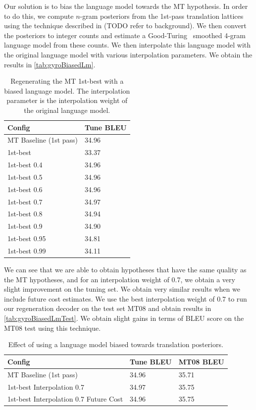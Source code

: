 Our solution is to bias the language model towards the MT hypothesis.
In order to do this, we compute $n$-gram posteriors from the
1st-pass translation lattices using the technique described
in (TODO refer to background). We then convert the posteriors
to integer counts and estimate a
Good-Turing~\citep{good:1953:biometrika,chen-goodman:1998:harvard} smoothed 4-gram
language model from these counts.
We then interpolate this language model with the original language model with
various interpolation parameters.
We obtain the results in \autoref{tab:gyroBiasedLm}.
%
\begin{table}
  \begin{center}
    \begin{tabular}{l|l}
      Config      & Tune BLEU \\
      \hline
      MT Baseline (1st pass) & 34.96 \\
      \hline
      1st-best      & 33.37 \\
      \hline
      1st-best 0.4  & 34.96 \\
      1st-best 0.5  & 34.96 \\
      1st-best 0.6  & 34.96 \\
      1st-best 0.7  & 34.97 \\
      1st-best 0.8  & 34.94 \\
      1st-best 0.9  & 34.90 \\
      1st-best 0.95 & 34.81 \\
      1st-best 0.99 & 34.11 \\
    \end{tabular}
    \caption{Regenerating the MT 1st-best with a biased language model.
      The interpolation parameter is the interpolation weight of the
      original language model.}
    \label{tab:gyroBiasedLm}
  \end{center}
\end{table}
%
We can see that we are able to obtain hypotheses that have
the same quality as the MT hypotheses, and for an interpolation
weight of 0.7, we obtain a very slight improvement on the tuning
set.
We obtain very similar results when we include future cost estimates.
We use the best interpolation weight of 0.7 to run
our regeneration decoder on the test set MT08 and obtain results
in \autoref{tab:gyroBiasedLmTest}.
We obtain slight gains in terms of BLEU score on the MT08 test
using this technique.
%
\begin{table}
  \begin{center}
    \begin{tabular}{l|l|l}
      Config & Tune BLEU & MT08 BLEU \\
      \hline
      MT Baseline (1st pass) & 34.96 & 35.71 \\
      \hline
      1st-best Interpolation 0.7 & 34.97 & 35.75 \\
      1st-best Interpolation 0.7 Future Cost & 34.96 & 35.75 \\
    \end{tabular}
    \caption{Effect of using a language model biased towards
    translation posteriors.}
    \label{tab:gyroBiasedLmTest}
  \end{center}
\end{table}

